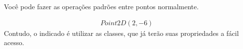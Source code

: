 \documentclass[letterpaper,10pt,english]{jupyterBook}
\begin{document}
\begin{sphinxVerbatim}[commandchars=\\\{\}]
  
  
  
   
\end{sphinxVerbatim}

\sphinxAtStartPar
Você pode fazer as operações padrões entre pontos normalmente.

\begin{sphinxVerbatim}[commandchars=\\\{\}]
   
\end{sphinxVerbatim}
\begin{equation*}
\begin{split}\displaystyle Point2D\left(2, -6\right)\end{split}
\end{equation*}
\sphinxAtStartPar
Contudo, o indicado é utilizar as classes, que já terão suas propriedades a fácil acesso.
\end{document}
